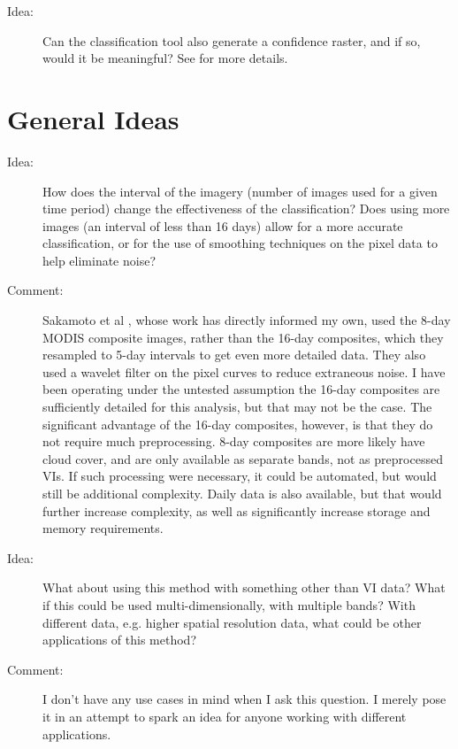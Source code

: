 \begin{description}
\item[Idea:] Can the classification tool also generate a confidence raster, and if so, would it be meaningful? See %
for more details.
\end{description}

\section{General Ideas}

\begin{description}
\item[Idea:] How does the interval of the imagery (number of images used for a given time period) change the effectiveness of the classification? Does using more images (an interval of less than 16 days) allow for a more accurate classification, or for the use of smoothing techniques on the pixel data to help eliminate noise?

\item[Comment:] Sakamoto et al %
, whose work has directly informed my own, used the 8-day MODIS composite images, rather than the 16-day composites, which they resampled to 5-day intervals to get even more detailed data. They also used a wavelet filter on the pixel curves to reduce extraneous noise. I have been operating under the untested assumption the 16-day composites are sufficiently detailed for this analysis, but that may not be the case. The significant advantage of the 16-day composites, however, is that they do not require much preprocessing. 8-day composites are more likely have cloud cover, and are only available as separate bands, not as preprocessed VIs. If such processing were necessary, it could be automated, but would still be additional complexity. Daily data is also available, but that would further increase complexity, as well as significantly increase storage and memory requirements.

\item[Idea:] What about using this method with something other than VI data? What if this could be used multi-dimensionally, with multiple bands? With different data, e.g. higher spatial resolution data, what could be other applications of this method?

\item[Comment:] I don’t have any use cases in mind when I ask this question. I merely pose it in an attempt to spark an idea for anyone working with different applications.
\end{description}


